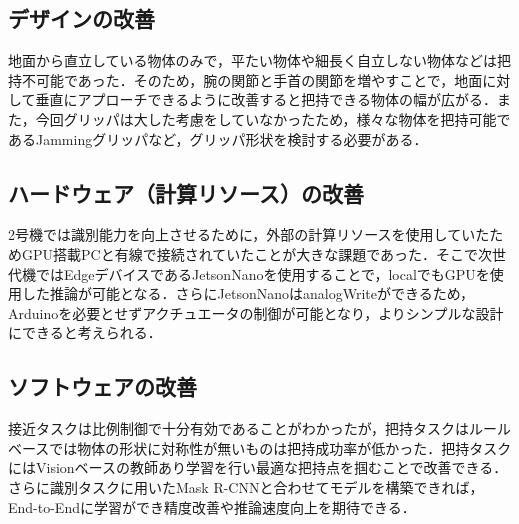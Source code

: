 \subsection*{デザインの改善}
地面から直立している物体のみで，平たい物体や細長く自立しない物体などは把持不可能であった．そのため，腕の関節と手首の関節を増やすことで，地面に対して垂直にアプローチできるように改善すると把持できる物体の幅が広がる．また，今回グリッパは大した考慮をしていなかったため，様々な物体を把持可能であるJammingグリッパ\cite{jamminggripper}など，グリッパ形状を検討する必要がある．

\subsection*{ハードウェア（計算リソース）の改善}
2号機では識別能力を向上させるために，外部の計算リソースを使用していたためGPU搭載PCと有線で接続されていたことが大きな課題であった．そこで次世代機ではEdgeデバイスであるJetsonNanoを使用することで，localでもGPUを使用した推論が可能となる．さらにJetsonNanoはanalogWriteができるため，Arduinoを必要とせずアクチュエータの制御が可能となり，よりシンプルな設計にできると考えられる．

\subsection*{ソフトウェアの改善}
接近タスクは比例制御で十分有効であることがわかったが，把持タスクはルールベースでは物体の形状に対称性が無いものは把持成功率が低かった．把持タスクにはVisionベースの教師あり学習を行い最適な把持点を掴むことで改善できる．さらに識別タスクに用いたMask R-CNNと合わせてモデルを構築できれば，End-to-Endに学習ができ精度改善や推論速度向上を期待できる．
